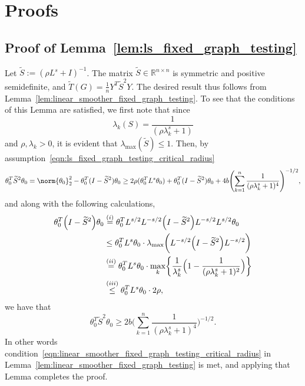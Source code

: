 \documentclass{article}
\newcommand{\Reals}{\mathbb{R}}
\newcommand{\1}{\mathbf{1}}
\newcommand{\Lap}{L}
\newcommand{\Id}{I}
\newcommand{\wt}[1]{\widetilde{#1}}
\theoremstyle{alden}
\theoremstyle{aldenthm}
\theoremstyle{definition}
\theoremstyle{remark}
\begin{document}
\section{Proofs}

\subsection{Proof of Lemma~\ref{lem:ls_fixed_graph_testing}}

Let $\wt{S} := (\rho \Lap^s + \Id)^{-1}$. The matrix $\wt{S} \in \Reals^{n \times n}$ is symmetric and positive semidefinite, and $\wt{T}(G) = \frac{1}{n}Y^T \wt{S}^2 Y$. The desired result thus follows from Lemma~\ref{lem:linear_smoother_fixed_graph_testing}. To see that the conditions of this Lemma are satisfied, we first note that since
\begin{equation*}
\lambda_k(S) = \frac{1}{(\rho\lambda_k^s + 1)}
\end{equation*}
and $\rho, \lambda_k > 0$, it is evident that $\lambda_{\max}(\wt{S}) \leq 1$.  Then, by assumption~\eqref{eqn:ls_fixed_graph_testing_critical_radius}
\begin{equation*}
\theta_0^{T} \wt{S}^2 \theta_0 = \norm{\theta_0}_2^2 - \theta_0^T(I - \wt{S}^2)\theta_0 \geq 2 \rho (\theta_0^T \Lap^s \theta_0) + \theta_0^T(I - \wt{S}^2)\theta_0 + 4b \Biggl(\sum_{k = 1}^{n} \frac{1}{(\rho\lambda_k^s + 1)^4} \Biggr)^{-1/2},
\end{equation*}
and along with the following calculations,
\begin{equation*}
\begin{aligned}
\theta_0^T \Bigl(\Id - \wt{S}^2\Bigr) \theta_0  & \overset{(i)}{=} \theta_0^T L^{s/2} L^{-s/2}\Bigl(\Id - \wt{S}^2\Bigr) L^{-s/2} L^{s/2} \theta_0 \\ 
& \leq \theta_0^T L^{s} \theta_0 \cdot  \lambda_{\max}\biggl(L^{-s/2}\Bigl(\Id - \wt{S}^2\Bigr) L^{-s/2}\biggr) \\ 
& \overset{(ii)}{=}  \theta_0^T L^{s} \theta_0 \cdot \max_{k} \biggl\{ \frac{1}{\lambda_k^s} \Bigl(1 - \frac{1}{(\rho \lambda_k^s + 1)^2}\Bigr) \biggr\} \\
& \overset{(iii)}{\leq} \theta_0^T L^{s} \theta_0 \cdot 2\rho,
\end{aligned}
\end{equation*}
we have that
\begin{equation*}
\theta_0^{T} \wt{S}^2 \theta_0 \geq 2b \biggl(\sum_{k = 1}^{n} \frac{1}{(\rho\lambda_k^s + 1)^4} \biggr)^{-1/2}.
\end{equation*} 
In other words condition~\eqref{eqn:linear_smoother_fixed_graph_testing_critical_radius} in Lemma~\ref{lem:linear_smoother_fixed_graph_testing} is met, and applying that Lemma completes the proof.
\end{document}
